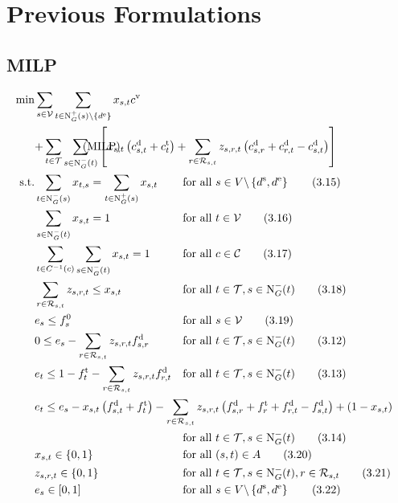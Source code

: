 \section{Previous Formulations}

\subsection{MILP}

\begin{align}
	\min & \sum_{s\in\mathcal{V}} \sum_{t\in\Nout(s)\backslash\{d^{\operatorname{e}}\}} x_{s,t}c^{\operatorname{v}} \nonumber \\
	& \omit\rlap{$\displaystyle{ + \sum_{t\in\mathcal{T}} \sum_{s\in\Nin(t)} \left[x_{s,t}\left(c_{s,t}^{\operatorname{d}}+c_{t}^{\operatorname{t}}\right) + \sum_{r\in\Rst} z_{s,r,t}\left(c_{s,r}^{\operatorname{d}}+c_{r,t}^{\operatorname{d}}-c_{s,t}^{\operatorname{d}}\right)\right]}$} \tag{MILP} \label{eq:MILP} \\
	\text{s.t.} & \sum_{t\in\Nin(s)} x_{t,s} = \sum_{t\in\Nout(s)} x_{s,t} & & \text{for all } s\in V\backslash\left\{d^{\operatorname{s}},d^{\operatorname{e}}\right\} \tag{3.15} \\
	& \sum_{s\in\Nin(t)} x_{s,t} = 1 & & \text{for all } t\in\mathcal{V} \tag{3.16} \\
	& \sum_{t\in C^{-1}(c)} \sum_{s\in\Nin(t)} x_{s,t} = 1 & & \text{for all } c\in\mathcal{C} \tag{3.17} \label{eq:costumer_prev} \\
	& \sum_{r\in\Rst} z_{s,r,t} \leq x_{s,t} & & \text{for all } t\in\mathcal{T}, s\in\Nin(t) \tag{3.18} \\
	& e_s \leq f_s^0 & & \text{for all } s\in\mathcal{V} \tag{3.19} \\
	& 0 \leq e_s - \sum_{r\in\Rst} z_{s,r,t}\fd_{s,r} & & \text{for all } t\in\mathcal{T}, s\in\Nin(t) \tag{3.12} \\
	& e_t \leq 1 - \ft_t - \sum_{r\in\Rst} z_{s,r,t}\fd_{r,t} & & \text{for all } t\in\mathcal{T}, s\in\Nin(t) \tag{3.13} \\
	& \omit\rlap{$\displaystyle{e_t \leq e_s - x_{s,t}\left(f_{s,t}^{\operatorname{d}}+f_t^{\operatorname{t}}\right) - \sum_{r\in\Rst} z_{s,r,t}\left(\fd_{s,r}+\ft_r+\fd_{r,t}-\fd_{s,t}\right) + \left(1-x_{s,t}\right)}$} \nonumber \\
	& & & \text{for all } t\in\mathcal{T}, s\in\Nin(t) \tag{3.14} \\
	& x_{s,t}\in\{0,1\} & & \text{for all } (s,t)\in A \tag{3.20} \\
	& z_{s,r,t}\in\{0,1\} & & \text{for all } t\in\mathcal{T},s\in\Nin(t),r\in\Rst \tag{3.21} \\
	& e_s\in[0,1] & & \text{for all } s\in V\backslash\left\{d^{\operatorname{s}},d^{\operatorname{e}}\right\} \tag{3.22}
\end{align}

